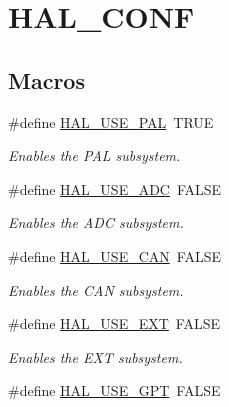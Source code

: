 \hypertarget{group__HAL__CONF}{\section{H\+A\+L\+\_\+\+C\+O\+N\+F}
\label{group__HAL__CONF}
}
\subsection*{Macros}
\begin{DoxyCompactItemize}
\item 
\hypertarget{group__HAL__CONF_ga2311bcc7b41bfba183c9ec1a64a11e93}{\#define \hyperlink{group__HAL__CONF_ga2311bcc7b41bfba183c9ec1a64a11e93}{H\+A\+L\+\_\+\+U\+S\+E\+\_\+\+P\+A\+L}~T\+R\+U\+E}\label{group__HAL__CONF_ga2311bcc7b41bfba183c9ec1a64a11e93}

\begin{DoxyCompactList}\small\item\em Enables the P\+A\+L subsystem. \end{DoxyCompactList}\item 
\hypertarget{group__HAL__CONF_ga413a1b6c0ca2c9e524df50ceac1275fd}{\#define \hyperlink{group__HAL__CONF_ga413a1b6c0ca2c9e524df50ceac1275fd}{H\+A\+L\+\_\+\+U\+S\+E\+\_\+\+A\+D\+C}~F\+A\+L\+S\+E}\label{group__HAL__CONF_ga413a1b6c0ca2c9e524df50ceac1275fd}

\begin{DoxyCompactList}\small\item\em Enables the A\+D\+C subsystem. \end{DoxyCompactList}\item 
\hypertarget{group__HAL__CONF_ga2e351185eace5acfd90b65c9fe796355}{\#define \hyperlink{group__HAL__CONF_ga2e351185eace5acfd90b65c9fe796355}{H\+A\+L\+\_\+\+U\+S\+E\+\_\+\+C\+A\+N}~F\+A\+L\+S\+E}\label{group__HAL__CONF_ga2e351185eace5acfd90b65c9fe796355}

\begin{DoxyCompactList}\small\item\em Enables the C\+A\+N subsystem. \end{DoxyCompactList}\item 
\hypertarget{group__HAL__CONF_ga2dd40c0fdd833b861f9241f6d282fe34}{\#define \hyperlink{group__HAL__CONF_ga2dd40c0fdd833b861f9241f6d282fe34}{H\+A\+L\+\_\+\+U\+S\+E\+\_\+\+E\+X\+T}~F\+A\+L\+S\+E}\label{group__HAL__CONF_ga2dd40c0fdd833b861f9241f6d282fe34}

\begin{DoxyCompactList}\small\item\em Enables the E\+X\+T subsystem. \end{DoxyCompactList}\item 
\hypertarget{group__HAL__CONF_gab4702b9e1b6fa2869e26c274fccd53f0}{\#define \hyperlink{group__HAL__CONF_gab4702b9e1b6fa2869e26c274fccd53f0}{H\+A\+L\+\_\+\+U\+S\+E\+\_\+\+G\+P\+T}~F\+A\+L\+S\+E}\label{group__HAL__CONF_gab4702b9e1b6fa2869e26c274fccd53f0}


\end{DoxyCompactItemize}
